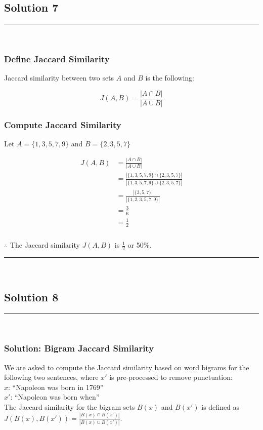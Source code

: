 \documentclass{article}
\begin{document}
\newpage

\subsection*{Solution 7}
\noindent\rule{\textwidth}{0.4pt}\\

\subsubsection*{Define Jaccard Similarity}
\parbox{\textwidth}{
Jaccard similarity between two sets $A$ and $B$ is the following:

$$J(A,B) = \frac{|A \cap B|}{|A \cup B|}$$
}
\subsubsection*{Compute Jaccard Similarity}
\parbox{\textwidth}{
Let $A = \{1, 3, 5, 7, 9\}$ and $B = \{2, 3, 5, 7\}$

\begin{align*}
    J(A, B) &= \frac{|A \cap B|}{|A \cup B|} \\
    &= \frac{|\{1, 3, 5, 7, 9\} \cap \{2, 3, 5, 7\}|}{|\{1, 3, 5, 7, 9\} \cup \{2, 3, 5, 7\}|} \\
    &= \frac{|\{3, 5, 7\}|}{|\{1, 2, 3, 5, 7, 9\}|} \\
    &= \frac{3}{6} \\
    &= \frac{1}{2}
\end{align*}
}

\subsubsection*{\normalfont}{$\therefore$ The Jaccard similarity $J(A, B)$ is $\frac{1}{2}$ or 50\%.}

\noindent\rule{\textwidth}{0.4pt}\\

\newpage

\subsection*{Solution 8}
\noindent\rule{\textwidth}{0.4pt}\\
\subsubsection*{Solution: Bigram Jaccard Similarity}
\parbox{\textwidth}{
We are asked to compute the Jaccard similarity based on word bigrams for the following two sentences, where $x'$ is pre-processed to remove punctuation:
\\
$x$: ``Napoleon was born in 1769''
\\
$x'$: ``Napoleon was born when''
\\
The Jaccard similarity for the bigram sets $B(x)$ and $B(x')$ is defined as $J(B(x), B(x')) = \frac{|B(x) \cap B(x')|}{|B(x) \cup B(x')|}$.
}
\end{document}
